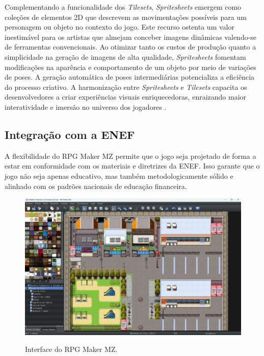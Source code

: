 Complementando a funcionalidade dos \textit{Tilesets}, \textit{Spritesheets} emergem como coleções de elementos 2D que descrevem as movimentações possíveis para um personagem ou objeto no contexto do jogo. Este recurso ostenta um valor inestimável para os artistas que almejam conceber imagens dinâmicas valendo-se de ferramentas convencionais. Ao otimizar tanto os custos de produção quanto a simplicidade na geração de imagens de alta qualidade, \textit{Spritesheets} fomentam modificações na aparência e comportamento de um objeto por meio de variações de poses. A geração automática de poses intermediárias potencializa a eficiência do processo criativo. A harmonização entre \textit{Spritesheets} e \textit{Tilesets} capacita os desenvolvedores a criar experiências visuais enriquecedoras, enraizando maior interatividade e imersão no universo dos jogadores \cite{jones2013dynamic}.

\subsection{Integração com a ENEF}
A flexibilidade do RPG Maker MZ permite que o jogo seja projetado de forma a estar em conformidade com os materiais e diretrizes da ENEF. Isso garante que o jogo não seja apenas educativo, mas também metodologicamente sólido e alinhado com os padrões nacionais de educação financeira.

\begin{figure}[ht]
	\centering
	\caption{Interface do RPG Maker MZ.}
	\includegraphics[scale=0.3]{Textuais/Pictures/RPGMaker_Interface.png}
	\label{fig:rpgmaker-interface}
\end{figure}


